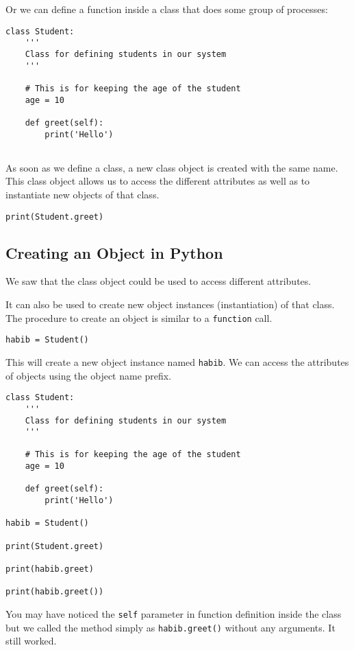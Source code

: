 \documentclass[11pt]{article}
\begin{document}
Or we can define a function inside a class that does some group of processes:

\begin{verbatim}
class Student:
    '''
    Class for defining students in our system
    '''

    # This is for keeping the age of the student
    age = 10

    def greet(self):
        print('Hello')


\end{verbatim}

As soon as we define a class, a new class object is created with the
same name. This class object allows us to access the different attributes as
well as to instantiate new objects of that class.

\begin{verbatim}
print(Student.greet)
\end{verbatim}

\subsection{Creating an Object in Python}
\label{sec:orgad99a17}

We saw that the class object could be used to access different attributes.

It can also be used to create new object instances (instantiation) of that
class. The procedure to create an object is similar to a \texttt{function} call.

\begin{verbatim}
habib = Student()
\end{verbatim}

This will create a new object instance named \texttt{habib}. We can access the
attributes of objects using the object name prefix.

\begin{verbatim}
class Student:
    '''
    Class for defining students in our system
    '''

    # This is for keeping the age of the student
    age = 10

    def greet(self):
        print('Hello')

habib = Student()

print(Student.greet)

print(habib.greet)

print(habib.greet())
\end{verbatim}

You may have noticed the \texttt{self} parameter in function definition inside the
class but we called the method simply as \texttt{habib.greet()} without any arguments.
It still worked.
\end{document}
